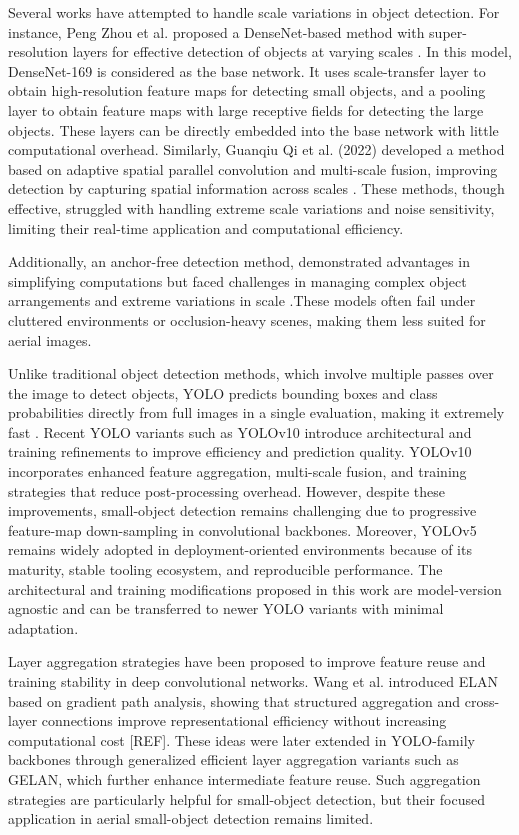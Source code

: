 \documentclass[preprint,review,12pt]{elsarticle}
\begin{document}
Several works have attempted to handle scale variations in object detection. For instance, Peng Zhou et al.  proposed a DenseNet-based method with super-resolution layers for effective detection of objects at varying scales \cite{zhou2018scale}. In this model, DenseNet-169 is considered as the base network. It uses scale-transfer layer to obtain high-resolution feature maps for detecting small objects, and a pooling layer to obtain feature maps with large receptive fields for detecting the large objects. These layers can be directly embedded into the base network with little computational overhead. Similarly, Guanqiu Qi et al. (2022) developed a method based on adaptive spatial parallel convolution and multi-scale fusion, improving detection by capturing spatial information across scales \cite{qi2022small}.  These methods, though effective, struggled with handling extreme scale variations and noise sensitivity, limiting their real-time application and computational efficiency.


Additionally,  an anchor-free detection method, demonstrated advantages in simplifying computations but faced challenges in managing complex object arrangements and extreme variations in scale \cite{kong2020foveabox}.These models often fail under cluttered environments or occlusion-heavy scenes, making them less suited for aerial images.



Unlike traditional object detection methods, which involve multiple passes over the image to detect objects, YOLO predicts bounding boxes and class probabilities directly from full images in a single evaluation, making it extremely fast \cite{Redmon2016, glenn_jocher_2020_4154370}. Recent YOLO variants such as YOLOv10 introduce architectural and training refinements to improve efficiency and prediction quality. YOLOv10 incorporates enhanced feature aggregation, multi-scale fusion, and training strategies that reduce post-processing overhead. However, despite these improvements, small-object detection remains challenging due to progressive feature-map down-sampling in convolutional backbones. Moreover, YOLOv5 remains widely adopted in deployment-oriented environments because of its maturity, stable tooling ecosystem, and reproducible performance. The architectural and training modifications proposed in this work are model-version agnostic and can be transferred to newer YOLO variants with minimal adaptation.

Layer aggregation strategies have been proposed to improve feature reuse and training stability in deep convolutional networks. Wang et al. introduced ELAN based on gradient path analysis, showing that structured aggregation and cross-layer connections improve representational efficiency without increasing computational cost [REF]. These ideas were later extended in YOLO-family backbones through generalized efficient layer aggregation variants such as GELAN, which further enhance intermediate feature reuse. Such aggregation strategies are particularly helpful for small-object detection, but their focused application in aerial small-object detection remains limited.
\end{document}
